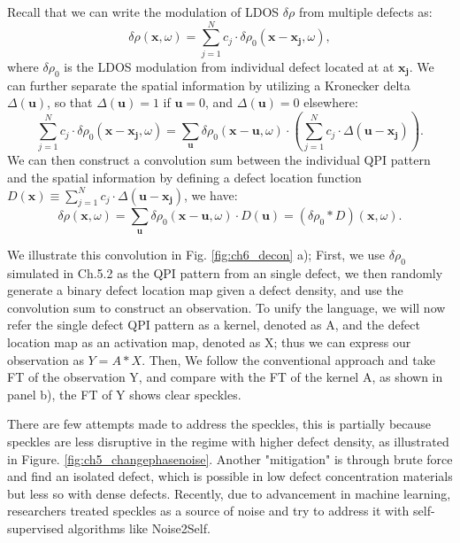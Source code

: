 \par \noindent Recall that we can write the modulation of \ac{LDOS} $\delta \rho$ from multiple defects as:
\begin{equation}
	\delta \rho(\mathbf{x}, \omega) = \sum_{j=1}^{N}c_j \cdot \delta \rho_0(\mathbf{x}-\mathbf{x_j},\omega),
\end{equation}
\noindent where $\delta \rho_0$ is the \ac{LDOS} modulation from individual defect located at at $\mathbf{x_j}$. We can further separate the spatial information by utilizing a Kronecker delta $\Delta(\mathbf{u})$, so that $\Delta(\mathbf{u})=1$ if $\mathbf{u} = 0$, and $\Delta(\mathbf{u})=0$ elsewhere: 
\begin{equation}
	\sum_{j=1}^{N}c_j \cdot \delta \rho_0(\mathbf{x}-\mathbf{x_j},\omega) = \sum_{\mathbf{u}} \delta \rho_0(\mathbf{x}-\mathbf{u},\omega)\cdot(\sum_{j=1}^{N} c_j \cdot \Delta(\mathbf{u-x_j})).
\end{equation}
\noindent We can then construct a convolution sum between the individual \ac{QPI} pattern and the spatial information by defining a defect location function $D(\mathbf{x}) \equiv \sum_{j=1}^{N} c_j \cdot \Delta(\mathbf{u-x_j})$, we have: 
\begin{equation}
	\delta \rho(\mathbf{x}, \omega) =  \sum_{\mathbf{u}} \delta \rho_0(\mathbf{x}-\mathbf{u},\omega)\cdot D(\mathbf{u}) = (\delta \rho_0 *D)(\mathbf{x}, \omega).
\end{equation}

We illustrate this convolution in Fig. \ref{fig:ch6_decon} a); First, we use $\delta \rho_0$ simulated in Ch.5.2 as the \ac{QPI} pattern from an single defect, we then randomly generate a binary defect location map given a defect density, and use the convolution sum to construct an observation. To unify the language, we will now refer the single defect \ac{QPI} pattern as a kernel, denoted as A, and the defect location map as an activation map, denoted as X; thus we can express our observation as $Y = A * X$. Then, We follow the conventional approach and take \ac{FT} of the observation Y, and compare with the \ac{FT} of the kernel A, as shown in panel b), the \ac{FT} of Y shows clear speckles.

There are few attempts made to address the speckles, this is partially because speckles are less disruptive in the regime with higher defect density, as illustrated in Figure. \ref{fig:ch5_changephasenoise}. Another "mitigation" is through brute force and find an isolated defect, which is possible in low defect concentration materials but less so with dense defects. Recently, due to advancement in machine learning, researchers treated speckles as a source of noise and try to address it with self-supervised algorithms like Noise2Self. 
 
